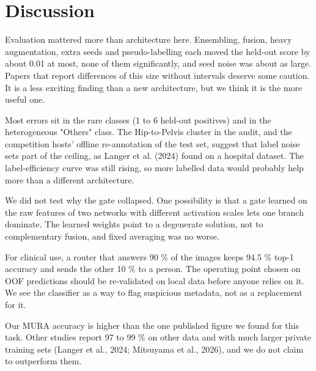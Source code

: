 \section{Discussion}
Evaluation mattered more than architecture here. Ensembling, fusion, heavy augmentation, extra seeds and pseudo-labelling each moved the held-out score by about 0.01 at most, none of them significantly, and seed noise was about as large. Papers that report differences of this size without intervals deserve some caution. It is a less exciting finding than a new architecture, but we think it is the more useful one.

Most errors sit in the rare classes (1 to 6 held-out positives) and in the heterogeneous "Others" class. The Hip-to-Pelvis cluster in the audit, and the competition hosts' offline re-annotation of the test set, suggest that label noise sets part of the ceiling, as Langer et al. (2024) found on a hospital dataset. The label-efficiency curve was still rising, so more labelled data would probably help more than a different architecture.

We did not test why the gate collapsed. One possibility is that a gate learned on the raw features of two networks with different activation scales lets one branch dominate. The learned weights point to a degenerate solution, not to complementary fusion, and fixed averaging was no worse.

For clinical use, a router that answers 90 \% of the images keeps 94.5 \% top-1 accuracy and sends the other 10 \% to a person. The operating point chosen on OOF predictions should be re-validated on local data before anyone relies on it. We see the classifier as a way to flag suspicious metadata, not as a replacement for it.

Our MURA accuracy is higher than the one published figure we found for this task. Other studies report 97 to 99 \% on other data and with much larger private training sets (Langer et al., 2024; Mitsuyama et al., 2026), and we do not claim to outperform them.


